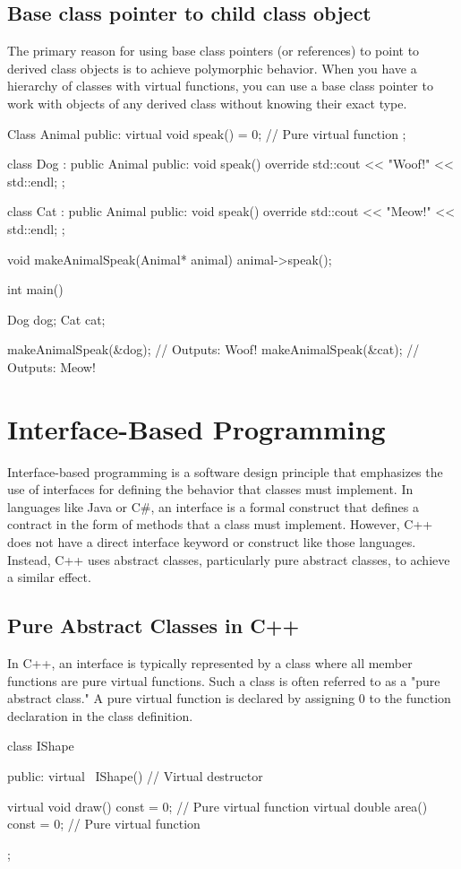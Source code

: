 \documentclass{report}
\begin{document}
    \subsection{Base class pointer to child class object}
    \bigbreak \noindent 
    The primary reason for using base class pointers (or references) to point to derived class objects is to achieve polymorphic behavior. When you have a hierarchy of classes with virtual functions, you can use a base class pointer to work with objects of any derived class without knowing their exact type.
    \bigbreak \noindent 
    \begin{cppcode}
Class Animal {
public:
    virtual void speak() = 0; // Pure virtual function
};

class Dog : public Animal {
public:
    void speak() override { std::cout << "Woof!" << std::endl; }
};

class Cat : public Animal {
public:
    void speak() override { std::cout << "Meow!" << std::endl; }
};

void makeAnimalSpeak(Animal* animal) {
    animal->speak();
}

int main() {
    Dog dog;
    Cat cat;

    makeAnimalSpeak(&dog); // Outputs: Woof!
    makeAnimalSpeak(&cat); // Outputs: Meow!
}
    \end{cppcode}

    \pagebreak \bigbreak \noindent 
    \section{Interface-Based Programming}
    \bigbreak \noindent 
    \begin{concept}
        Interface-based programming is a software design principle that emphasizes the use of interfaces for defining the behavior that classes must implement. In languages like Java or C\#, an interface is a formal construct that defines a contract in the form of methods that a class must implement. However, C++ does not have a direct interface keyword or construct like those languages. Instead, C++ uses abstract classes, particularly pure abstract classes, to achieve a similar effect. 
    \end{concept}

    \bigbreak \noindent 
    \subsection{Pure Abstract Classes in C++}
    \bigbreak \noindent 
    In C++, an interface is typically represented by a class where all member functions are pure virtual functions. Such a class is often referred to as a "pure abstract class." A pure virtual function is declared by assigning 0 to the function declaration in the class definition.
    \bigbreak \noindent 
    \begin{cppcode}
class IShape {
public:
    virtual ~IShape() {} // Virtual destructor

    virtual void draw() const = 0; // Pure virtual function
    virtual double area() const = 0; // Pure virtual function
};
    \end{cppcode}
\end{document}
